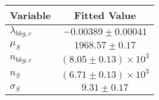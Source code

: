 \begin{tabular}[t]{lc}
\hline
Variable &Fitted Value\\
\hline\hline
$\lambda_{bkg,c}$&$-0.00389\pm0.00041$\\
\hline
$\mu_{S}$&$1968.57\pm0.17$\\
\hline
$n_{bkg,c}$&$(8.05\pm0.13)\times 10^3$\\
\hline
$n_{S}$&$(6.71\pm0.13)\times 10^3$\\
\hline
$\sigma_{S}$&$9.31\pm0.17$\\
\hline
\end{tabular}